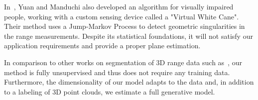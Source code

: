 In~\cite{yuan05dynamic}, Yuan and Manduchi also developed an algorithm for
visually impaired people, working with a custom sensing device called
a "Virtual White Cane". Their method uses a Jump-Markov Process to detect
geometric singularities in the range measurements. Despite its statistical
foundations, it will not satisfy our application requirements and
provide a proper plane estimation.

In comparison to other works on segmentation of 3D range data such
as~\cite{anguelov05discriminative}, our method is fully unsupervised and thus
does not require any training data. Furthermore, the dimensionality of our
model adapts to the data and, in addition to a labeling of 3D point clouds, we
estimate a full generative model.
